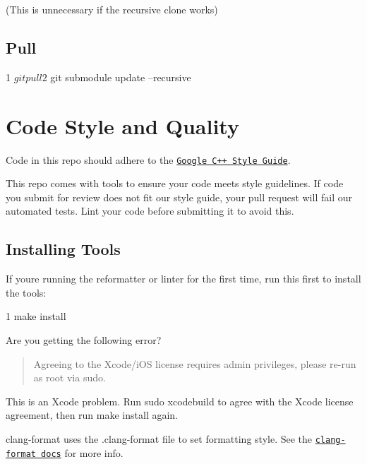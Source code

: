 (This is unnecessary if the recursive clone works)




\subsection*{Pull}


\begin{DoxyCode}
1 $ git pull
2 $ git submodule update --recursive
\end{DoxyCode}


\section*{Code Style and Quality}

Code in this repo should adhere to the \href{https://google.github.io/styleguide/cppguide.html}{\tt Google C++ Style Guide}.

This repo comes with tools to ensure your code meets style guidelines. If code you submit for review does not fit our style guide, your pull request will fail our automated tests. Lint your code before submitting it to avoid this.

\subsection*{Installing Tools}

If you\textquotesingle{}re running the reformatter or linter for the first time, run this first to install the tools\+:


\begin{DoxyCode}
1 make install
\end{DoxyCode}


Are you getting the following error?

\begin{quote}
Agreeing to the Xcode/i\+OS license requires admin privileges, please re-\/run as root via sudo. \end{quote}


This is an Xcode problem. Run {\ttfamily sudo xcodebuild} to agree with the Xcode license agreement, then run {\ttfamily make install} again.

clang-\/format uses the {\ttfamily .clang-\/format} file to set formatting style. See the \href{http://clang.llvm.org/docs/ClangFormat.html}{\tt clang-\/format docs} for more info.


